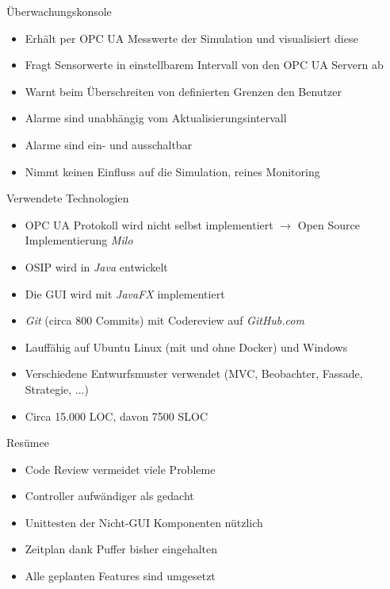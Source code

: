 \documentclass[22pt]{beamer}
\begin{document}
\begin{frame}{Überwachungskonsole}
 \begin{itemize}[<+->]
  \item Erhält per OPC UA Messwerte der Simulation und visualisiert diese
  \item Fragt Sensorwerte in einstellbarem Intervall von den OPC UA Servern ab
  \item Warnt beim Überschreiten von definierten Grenzen den Benutzer
  \item Alarme sind unabhängig vom Aktualisierungsintervall
  \item Alarme sind ein- und ausschaltbar
  \item Nimmt keinen Einfluss auf die Simulation, reines Monitoring
 \end{itemize}
\end{frame}

\begin{frame}{Verwendete Technologien}
\begin{itemize}[<+->]
 \item OPC UA Protokoll wird nicht selbst implementiert $\rightarrow$ Open Source Implementierung \emph{Milo}
 \item OSIP wird in \emph{Java} entwickelt
 \item Die GUI wird mit \emph{JavaFX} implementiert
 \item \emph{Git} (circa 800 Commits) mit Codereview auf \emph{GitHub.com}
 \item Lauffähig auf Ubuntu Linux (mit und ohne Docker) und Windows
 \item Verschiedene Entwurfsmuster verwendet (MVC, Beobachter, Fassade, Strategie, ...)
 \item Circa 15.000 LOC, davon 7500 SLOC
\end{itemize}
\end{frame}

\begin{frame}{Resümee}
\begin{itemize}[<+->]
 \item Code Review vermeidet viele Probleme
 \item Controller aufwändiger als gedacht
 \item Unittesten der Nicht-GUI Komponenten nützlich
 \item Zeitplan dank Puffer bisher eingehalten
 \item Alle geplanten Features sind umgesetzt
\end{itemize}
\end{frame}
\end{document}
